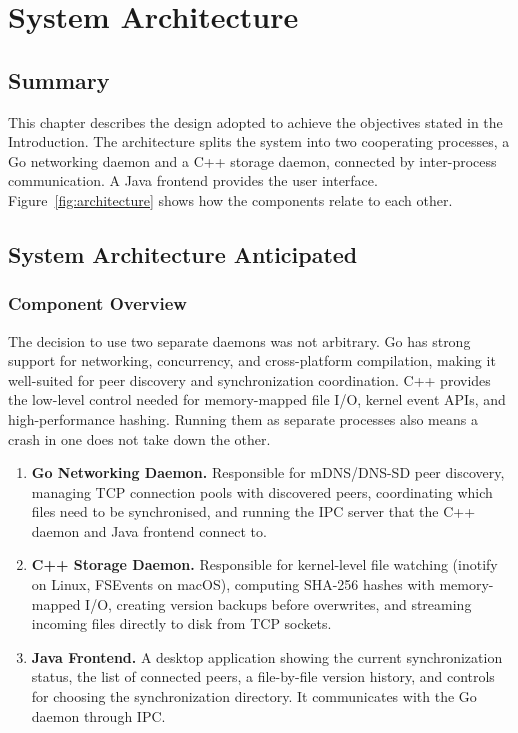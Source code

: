 \chapter{System Architecture}

\section*{Summary}
This chapter describes the design adopted to achieve the objectives stated in the Introduction. The architecture splits the system into two cooperating processes, a Go networking daemon and a C++ storage daemon, connected by inter-process communication. A Java frontend provides the user interface. Figure~\ref{fig:architecture} shows how the components relate to each other.

\section{System Architecture Anticipated}
\label{sec:arch-anticipated}

\subsection{Component Overview}

The decision to use two separate daemons was not arbitrary. Go has strong support for networking, concurrency, and cross-platform compilation, making it well-suited for peer discovery and synchronization coordination. C++ provides the low-level control needed for memory-mapped file I/O, kernel event APIs, and high-performance hashing. Running them as separate processes also means a crash in one does not take down the other.

\begin{enumerate}
    \item \textbf{Go Networking Daemon.} Responsible for mDNS/DNS-SD peer discovery, managing TCP connection pools with discovered peers, coordinating which files need to be synchronised, and running the IPC server that the C++ daemon and Java frontend connect to.

    \item \textbf{C++ Storage Daemon.} Responsible for kernel-level file watching (inotify on Linux, FSEvents on macOS), computing SHA-256 hashes with memory-mapped I/O, creating version backups before overwrites, and streaming incoming files directly to disk from TCP sockets.

    \item \textbf{Java Frontend.} A desktop application showing the current synchronization status, the list of connected peers, a file-by-file version history, and controls for choosing the synchronization directory. It communicates with the Go daemon through IPC.
\end{enumerate}

